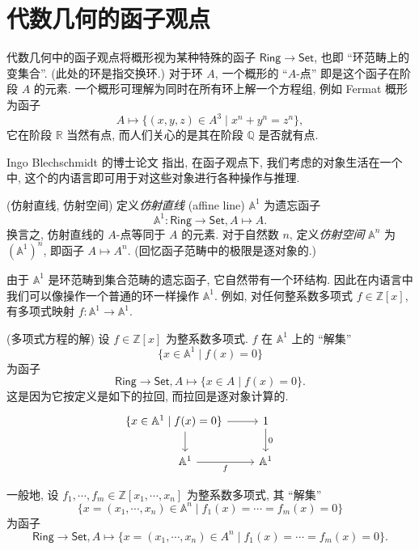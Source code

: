 
\section{代数几何的函子观点}

代数几何中的函子观点将概形视为某种特殊的函子 $\mathsf {Ring}\to\mathsf {Set}$, 也即 ``环范畴上的变集合''. (此处的环是指交换环.) 对于环 $A$, 一个概形的 ``$A$-点'' 即是这个函子在阶段 $A$ 的元素. 一个概形可理解为同时在所有环上解一个方程组, 例如 Fermat 概形为函子 $$A\mapsto \{(x,y,z)\in A^3\mid x^n+y^n=z^n\},$$ 它在阶段 $\mathbb{R}$ 当然有点, 而人们关心的是其在阶段 $\mathbb{Q}$ 是否就有点.

Ingo Blechschmidt 的博士论文 \cite{ILAG} 指出, 在函子观点下, 我们考虑的对象生活在一个\topos{}中, 这个\topos{}的内语言即可用于对这些对象进行各种操作与推理.

\begin{definition}
	[label={affine-line}]
	{(仿射直线, 仿射空间)}
	定义\emph{仿射直线} (affine line) $\mathbb A^1$ 为遗忘函子
	$$
	\mathbb A^1\colon \mathsf {Ring}\to\mathsf {Set},A\mapsto A.
	$$
	换言之, 仿射直线的 $A$-点等同于 $A$ 的元素.
	对于自然数 $n$, 定义\emph{仿射空间} $\mathbb A^n$ 为 $(\mathbb A^1)^n$, 即函子 $A\mapsto A^n$. (回忆函子范畴中的极限是逐对象的.)
\end{definition}



由于 $\mathbb A^1$ 是环范畴到集合范畴的遗忘函子, 它自然带有一个环结构. 因此在内语言中我们可以像操作一个普通的环一样操作 $\mathbb A^1$.
例如, 对任何整系数多项式 $f\in\mathbb{Z}[x]$, 有多项式映射 $f\colon \mathbb A^1\to\mathbb A^1$.

\begin{example}
	{(多项式方程的解)}
	设 $f\in\mathbb{Z}[x]$ 为整系数多项式. $f$ 在 $\mathbb{A}^1$ 上的 ``解集''
	$$
	\{x\in\mathbb A^1\mid f(x)=0\}
	$$
	为函子
	$$
	\mathsf {Ring}\to\mathsf {Set}, A\mapsto\{x\in A\mid f(x)=0\}.
	$$
	这是因为它按定义是如下的拉回, 而拉回是逐对象计算的.
	\[\begin{tikzcd}[ampersand replacement=\&]
		{\hspace{-2em}\{x\in\mathbb A^1\mid f(x)=0\}} \& 1 \\
		{\mathbb A^1} \& {\mathbb A^1}
		\arrow[from=1-1, to=1-2]
		\arrow[from=1-1, to=2-1]
		\arrow["0", from=1-2, to=2-2]
		\arrow["f"', from=2-1, to=2-2]
	\end{tikzcd}\]
	
	一般地, 设 $f_1,\cdots,f_m\in\mathbb{Z}[x_1,\cdots,x_n]$ 为整系数多项式, 其 ``解集''
	$$
	\{x=(x_1,\cdots,x_n)\in\mathbb A^n\mid f_1(x)=\cdots=f_m(x)=0\}
	$$
	为函子
	$$
	\mathsf {Ring}\to\mathsf {Set}, A\mapsto\{x=(x_1,\cdots,x_n)\in A^n \mid f_1(x)=\cdots = f_m(x)=0\}.
	$$
\end{example}

